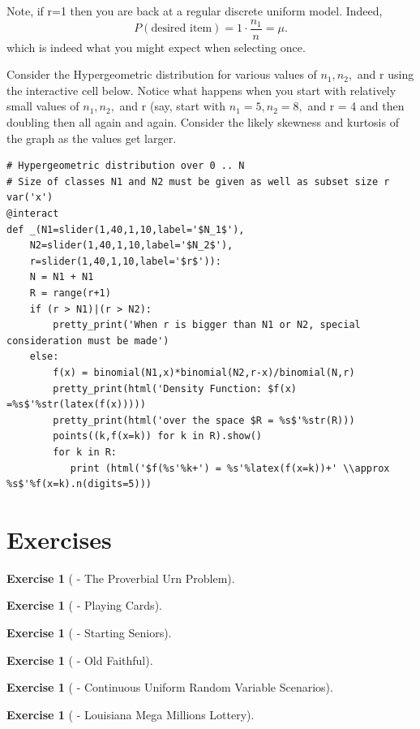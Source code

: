 \documentclass[10pt,]{book}
\theoremstyle{plain}
\theoremstyle{definition}
\theoremstyle{definition}
\theoremstyle{definition}
\newtheorem{exercise}[theorem]{Exercise}
\numberwithin{equation}{section}
\begin{document}
	Note, if r=1 then you are back at a regular discrete uniform model. Indeed, \begin{equation*}P(\text{desired item}) = 1 \cdot \frac{n_1}{n} = \mu .\end{equation*}
	which is indeed what you might expect when selecting once.
\par
Consider the Hypergeometric distribution for various values of \(n_1, n_2,\) and r using the interactive cell below. Notice what happens when you start with relatively small values of \(n_1, n_2,\) and r (say, start with \(n_1 = 5, n_2 = 8,\) and r = 4 and then doubling then all again and again. Consider the likely skewness and kurtosis of the graph as the values get larger.
%
\begin{lstlisting}[style=sageinput]
# Hypergeometric distribution over 0 .. N
# Size of classes N1 and N2 must be given as well as subset size r
var('x')
@interact
def _(N1=slider(1,40,1,10,label='$N_1$'),
    N2=slider(1,40,1,10,label='$N_2$'),
    r=slider(1,40,1,10,label='$r$')):
    N = N1 + N1
    R = range(r+1)
    if (r > N1)|(r > N2):
        pretty_print('When r is bigger than N1 or N2, special consideration must be made')
    else:
        f(x) = binomial(N1,x)*binomial(N2,r-x)/binomial(N,r)
        pretty_print(html('Density Function: $f(x) =%s$'%str(latex(f(x)))))
        pretty_print(html('over the space $R = %s$'%str(R)))
        points((k,f(x=k)) for k in R).show()
        for k in R:
           print (html('$f(%s'%k+') = %s'%latex(f(x=k))+' \\approx %s$'%f(x=k).n(digits=5)))
\end{lstlisting}
\typeout{************************************************}
\typeout{************************************************}
\section[{Exercises}]{Exercises}\label{section-29}
\begin{exercise}[{ - The Proverbial Urn Problem}]\label{exercise-6}
\end{exercise}
\begin{exercise}[{ - Playing Cards}]\label{exercise-7}
\end{exercise}
\begin{exercise}[{ - Starting Seniors}]\label{exercise-8}
\end{exercise}
\begin{exercise}[{ - Old Faithful}]\label{exercise-9}
\end{exercise}
\begin{exercise}[{ - Continuous Uniform Random Variable Scenarios}]\label{exercise-10}
\end{exercise}
\begin{exercise}[{ - Louisiana Mega Millions Lottery}]\label{exercise-11}
\end{exercise}
\typeout{************************************************}
\typeout{************************************************}
\end{document}
